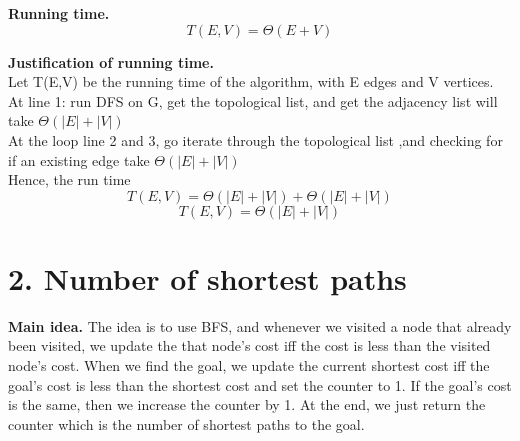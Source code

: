 \documentclass[11pt]{article}
\begin{document}
\noindent
\textbf{Running time.}\\
$$\boxed{T(E,V) = \Theta(E + V)}$$


\noindent
\textbf{Justification of running time.}\\
Let T(E,V) be the running time of the algorithm, with E edges and V vertices.\\
At line 1: run DFS on G, get the topological list, and get the adjacency list will take $\Theta(|E| + |V|)$\\
At the loop line 2 and 3, go iterate through the topological list ,and checking for if an  existing edge take $\Theta(|E| + |V|)$ \\
Hence, the run time
$$T(E,V) = \Theta(|E| + |V|) + \Theta(|E| + |V|)$$
$$\boxed{T(E,V) = \Theta{(|E| + |V|)}}$$

\newpage
\section*{2. Number of shortest paths}
\noindent
\textbf{Main idea.}
The idea is to use BFS, and whenever we visited a node that already been visited, we update the that node's cost iff the cost is less than the visited node's cost. When we find the goal, we update the current shortest cost iff the goal's cost is less than the shortest cost and set the counter to 1. If the goal's cost is the same, then we increase the counter by 1. At the end, we just return the counter which is the number of shortest paths to the goal.
\end{document}
